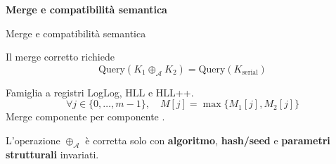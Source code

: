 \documentclass[aspectratio=169,11pt]{beamer}
\begin{document}
\begin{frame}[plain]
  \centering
  \vfill
  {\LARGE\bfseries Merge e compatibilit\`a semantica}
  \vfill
\end{frame}

\begin{frame}{Merge e compatibilit\`a semantica}
  
    Il merge corretto richiede
    \[
      \mathrm{Query}(K_1 \oplus_{\mathcal A} K_2)
      =
      \mathrm{Query}(K_{\mathrm{serial}})
    \]
  
      \vspace{0.20cm}

  
      \begin{block}{Famiglia a registri}
        \small
        LogLog, HLL e HLL++.
        \[
          \forall j \in \{0,\dots,m-1\},
          \quad
          M[j] = \max\{M_1[j], M_2[j]\}
        \]
        \small
        Merge componente per componente \cite{Ertl_2017_HLLAlgorithms}.
      \end{block}

        \vspace{0.20cm}

    L'operazione \(\oplus_{\mathcal A}\) \`e corretta solo con
    \textbf{algoritmo}, \textbf{hash/seed}
    e \textbf{parametri strutturali} invariati.

\end{frame}
\end{document}

